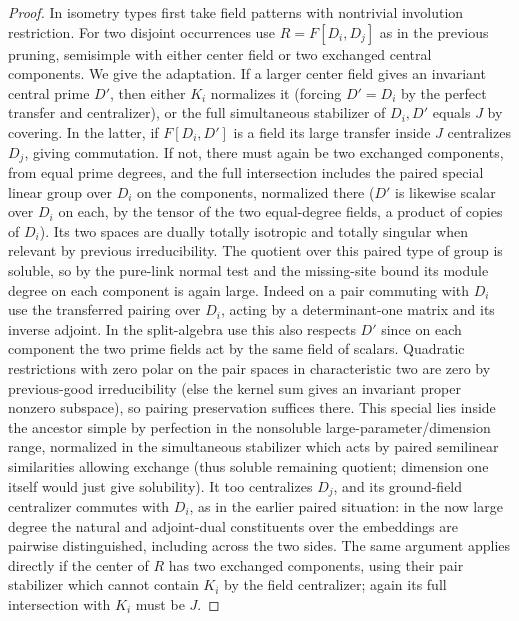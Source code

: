 \begin{proof}
In isometry types first take field patterns with nontrivial involution restriction. For two disjoint occurrences use \(R=F[D_i,D_j]\) as in the previous pruning, semisimple with either center field or two exchanged central components. We give the adaptation. If a larger center field gives an invariant central prime \(D'\), then either \(K_i\) normalizes it (forcing \(D'=D_i\) by the perfect transfer and centralizer), or the full simultaneous stabilizer of \(D_i,D'\) equals \(J\) by covering. In the latter, if \(F[D_i,D']\) is a field its large transfer inside \(J\) centralizes \(D_j\), giving commutation. If not, there must again be two exchanged components, from equal prime degrees, and the full intersection includes the paired special linear group over \(D_i\) on the components, normalized there (\(D'\) is likewise scalar over \(D_i\) on each, by the tensor of the two equal-degree fields, a product of copies of \(D_i\)). Its two spaces are dually totally isotropic and totally singular when relevant by previous irreducibility. The quotient over this paired type of group is soluble, so by the pure-link normal test and the missing-site bound its module degree on each component is again large. Indeed on a pair commuting with \(D_i\) use the transferred pairing over \(D_i\), acting by a determinant-one matrix and its inverse adjoint. In the split-algebra use this also respects \(D'\) since on each component the two prime fields act by the same field of scalars. Quadratic restrictions with zero polar on the pair spaces in characteristic two are zero by previous-good irreducibility (else the kernel sum gives an invariant proper nonzero subspace), so pairing preservation suffices there. This special lies inside the ancestor simple by perfection in the nonsoluble large-parameter/dimension range, normalized in the simultaneous stabilizer which acts by paired semilinear similarities allowing exchange (thus soluble remaining quotient; dimension one itself would just give solubility). It too centralizes \(D_j\), and its ground-field centralizer commutes with \(D_i\), as in the earlier paired situation: in the now large degree the natural and adjoint-dual constituents over the embeddings are pairwise distinguished, including across the two sides. The same argument applies directly if the center of \(R\) has two exchanged components, using their pair stabilizer which cannot contain \(K_i\) by the field centralizer; again its full intersection with \(K_i\) must be \(J\).


\end{proof}

